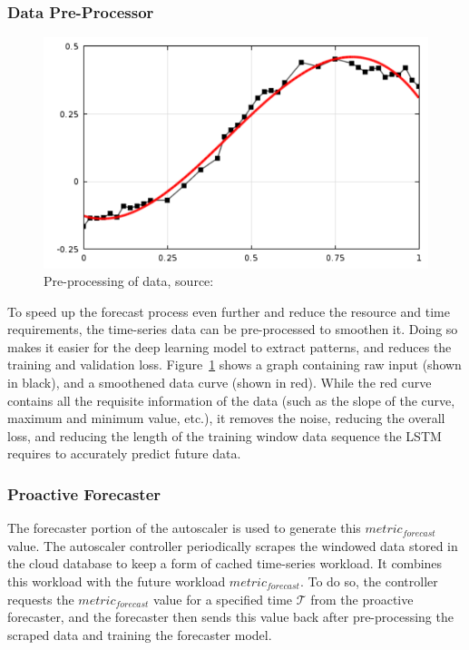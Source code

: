 \subsubsection{Data Pre-Processor}
\label{subsubsec:ch4-data-pre-process}

\begin{figure}[htb]
    \centering
    \caption[Pre-processing of data]{Pre-processing of data, source:~\cite{comsolcurvefitting}}
    \label{fig:data-pre-process}
    \includegraphics[width=0.6\linewidth]{Figures/Data-Pre-Processing.pdf}
\end{figure}

To speed up the forecast process even further and reduce the resource and time requirements, the time-series data can be pre-processed to smoothen it. Doing so makes it easier for the deep learning model to extract patterns, and reduces the training and validation loss. Figure~\ref{fig:data-pre-process} shows a graph containing raw input (shown in black), and a smoothened data curve (shown in red). While the red curve contains all the requisite information of the data (such as the slope of the curve, maximum and minimum value, etc.), it removes the noise, reducing the overall loss, and reducing the length of the training window data sequence the LSTM requires to accurately predict future data.\par

\subsubsection{Proactive Forecaster}

The forecaster portion of the autoscaler is used to generate this $metric_{forecast}$ value. The autoscaler controller periodically scrapes the windowed data stored in the cloud database to keep a form of cached time-series workload. It combines this workload with the future workload $metric_{forecast}$. To do so, the controller requests the $metric_{forecast}$ value for a specified time $\mathcal{T}$ from the proactive forecaster, and the forecaster then sends this value back after pre-processing the scraped data and training the forecaster model.\par

